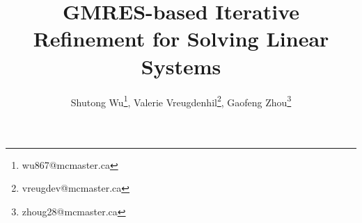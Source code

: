 \documentclass[12pt]{article}
\begin{document}
%
\title{GMRES-based Iterative Refinement for
Solving Linear Systems}


\author{Shutong Wu\thanks{wu867@mcmaster.ca}, Valerie Vreugdenhil\thanks{vreugdev@mcmaster.ca}, Gaofeng Zhou\thanks{zhoug28@mcmaster.ca}}
%
%
\maketitle             
\newpage
\tableofcontents
\newpage









%
\end{document}
